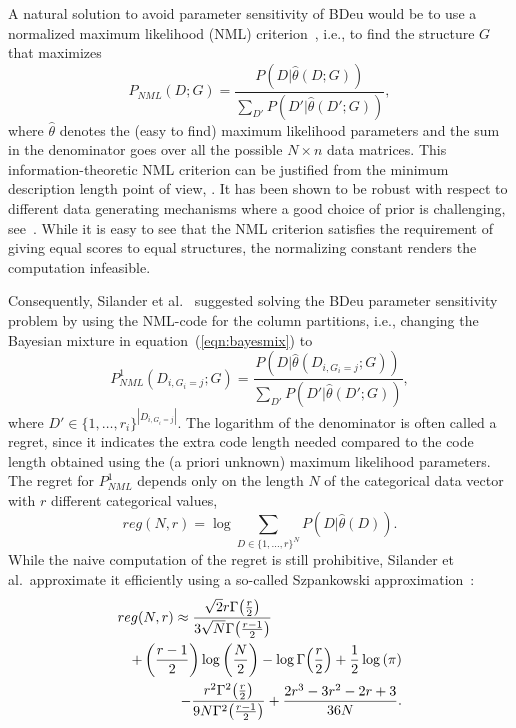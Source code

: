 A natural solution to avoid parameter sensitivity of BDeu would be to
use a normalized maximum likelihood (NML)
criterion~\cite{Shta87,Riss96a}, i.e., to find the structure $G$ that
maximizes
\begin{equation}
P_{NML}(D;G)=\frac{P(D|\hat\theta(D;G))}{\sum_{D'}{P(D'|\hat\theta(D';G))}},
\end{equation}
where $\hat\theta$ denotes the (easy to find) maximum likelihood
parameters and the sum in the denominator goes over all the possible
$N\times n$ data matrices. This information-theoretic NML criterion
can be justified from the minimum description length point of view,
\cite{Riss78,Grun07}. It has been shown to be robust with respect to
different data generating mechanisms where a good choice of prior
is challenging, see~\cite{eggeling2014robust,maatta16}. While it is
easy to see that the NML criterion satisfies the requirement of giving
equal scores to equal structures, the normalizing constant renders the
computation infeasible.

Consequently, Silander et al.~\cite{cosco.pgm08a}
suggested solving the BDeu parameter sensitivity problem by using the
NML-code for the column partitions, i.e., changing the Bayesian mixture
in equation~(\ref{eqn:bayesmix}) to
\begin{equation}
P^1_{NML}(D_{i,G_i=j};G)=\frac{P(D|\hat\theta(D_{i,G_i=j};G))}{\sum_{D'}{P(D'|\hat\theta(D';G))}},
\end{equation}
where $D'\in{\{1,\ldots,r_i\}}^{|D_{i,G_i=j}|}$.  The logarithm of the
denominator is often called a regret, since it indicates the extra
code length needed compared to the code length obtained using the (a
priori unknown) maximum likelihood parameters. The regret for
$P^1_{NML}$ depends only on the length $N$ of the categorical data
vector with $r$ different categorical values,
\begin{equation}
reg(N,r)=\log \sum_{D\in \{1,\ldots,r\}^N} P(D|\hat\theta(D)).
\end{equation}
While the naive
computation of the regret is still prohibitive, Silander et al.\
approximate it efficiently using a so-called Szpankowski
approximation~\cite{cosco.aistat03}:
\begin{eqnarray}
\label{eqn:szp1}
\lefteqn{reg(N,r) \approx \frac{\sqrt{2} r \Gamma{\left(\frac{r}{2} \right)}}
                               {3 \sqrt{N} \Gamma{\left(\frac{r-1}{2}  \right)}}} \\
&&+ \left(\frac{r-1}{2}\right) \log{\left (\frac{N}{2} \right )}
- \log \Gamma{\left(\frac{r}{2} \right)} + \frac{1}{2} \log{\left (\pi \right )}\nonumber\\
&&- \frac{r^{2} \Gamma^{2}{\left(\frac{r }{2} \right)}}
         {9N \Gamma^{2}{\left(\frac{r-1}{2}\right)}}
+ \frac{2r^3-3r^2-2r+3}{36N}\nonumber.
\end{eqnarray}

